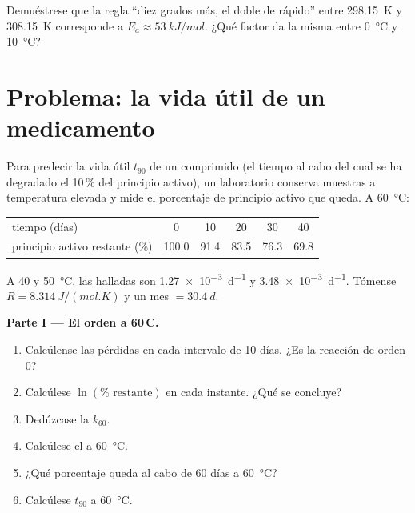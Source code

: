 \begin{exercise}[$\star\star\star$]\label{exo:b1:rate-laws:12}
Demuéstrese que la regla ``diez grados más, el doble de rápido'' entre
\qty{298.15}{K} y \qty{308.15}{K} corresponde a $E_a \approx
\qty{53}{kJ/mol}$. ¿Qué factor da la misma  entre
\qty{0}{\celsius} y \qty{10}{\celsius}?
\end{exercise}

\section{Problema: la vida útil de un medicamento}

\begin{problem}
\label{pb:b1:rate-laws:1}
Para predecir la vida útil $t_{90}$ de un comprimido (el tiempo al cabo del
cual se ha degradado el 10\,\% del principio activo), un laboratorio
conserva muestras a temperatura elevada y mide el porcentaje de principio
activo que queda. A
\qty{60}{\celsius}:
\begin{center}
\begin{tabular}{lccccc}
\hline
tiempo (días) & 0 & 10 & 20 & 30 & 40 \\
principio activo restante (\%) & 100.0 & 91.4 & 83.5 & 76.3 & 69.8 \\
\hline
\end{tabular}
\end{center}
A 40 y \qty{50}{\celsius}, las  halladas son
\qty{1.27e-3}{d^{-1}} y \qty{3.48e-3}{d^{-1}}. Tómense $R =
\qty{8.314}{J/(mol.K)}$ y un mes $= \qty{30.4}{d}$.

\medskip
\noindent\textbf{Parte I --- El orden a 60\,\textdegree C.}
\begin{enumerate}
  \item Calcúlense las pérdidas en cada intervalo de 10 días. ¿Es la
        reacción de orden 0?
  \item Calcúlese $\ln(\%\text{ restante})$ en cada instante. ¿Qué se
        concluye?
  \item Dedúzcase la  $k_{60}$.
  \item Calcúlese el  a \qty{60}{\celsius}.
  \item ¿Qué porcentaje queda al cabo de 60 días a \qty{60}{\celsius}?
  \item Calcúlese $t_{90}$ a \qty{60}{\celsius}.
\end{enumerate}


\end{problem}
